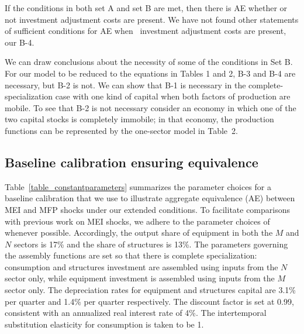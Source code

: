 \documentclass[12pt,fleqn]{article}
\begin{document}
If the conditions in both set A and set B are met, then there is AE whether
or not investment adjustment costs are present. We have not found other statements of sufficient
conditions for AE when \ investment adjustment costs are present, our B-4.

We can draw conclusions about the necessity of some of the conditions in Set
B. For our model to be reduced to the equations in Tables 1 and 2, B-3 and B-4 are
necessary, but B-2 is not. We can show that B-1 is necessary  in the
complete-specialization case with one kind of capital when both factors of
production are mobile. To see that B-2 is not necessary consider an economy
in which one of the two capital stocks is completely immobile; in that
economy, the production functions can be represented by the one-sector model
in Table~2.

\subsection{\protect\normalsize Baseline calibration ensuring equivalence}

Table~\ref{table_constantparameters} summarizes the parameter
choices for a baseline calibration that we use to illustrate aggregate
equivalence (AE) between MEI and MFP shocks under our extended conditions.
To facilitate comparisons with previous work on MEI shocks, we adhere to the
parameter choices of  whenever possible.
Accordingly, the output share of equipment in both the $M$ and $N$ sectors
is 17\% and the share of structures is 13\%. The parameters governing the
assembly functions are set so that there is complete specialization:
consumption and structures investment are assembled using inputs from the $N$
sector only, while equipment investment is assembled using inputs from the $%
M $ sector only. The depreciation rates for equipment and
structures capital are 3.1\% per quarter and 1.4\% per quarter
respectively. The discount factor is set at 0.99, consistent with an
annualized real interest rate of 4\%. The intertemporal substitution
elasticity for consumption is taken to be 1.
\end{document}
